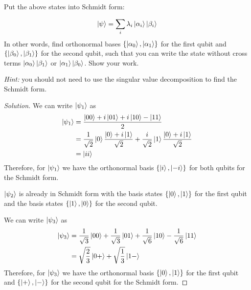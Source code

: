\begin{solution}[label=ques:4a]
  \begin{question}
    Put the above states into Schmidt form:

\[
\ket{\psi} = \sum_{i} \lambda_{i} \ket{\alpha_i}\ket{\beta_i}
\]
In other words, find orthonormal bases $\{\ket{\alpha_0},\ket{\alpha_1}\}$ for the first qubit and $\{\ket{\beta_0},\ket{\beta_1}\}$ for the second qubit, such that you can write the state without cross terms $\ket{\alpha_0}\ket{\beta_1}$ or $\ket{\alpha_1}\ket{\beta_0}$.
Show your work.

\noindent \textit{Hint:} you should not need to use the singular value decomposition to find the Schmidt form.
  \end{question}
  \tcblower{}
  \begin{proof}[Solution]
    We can write $\ket{\psi_1}$ as
    \begin{equation}
      \begin{split}
        \ket{\psi_1} &= \frac{\ket{00} + i\ket{01} +  i\ket{10} - \ket{11}}{2}\\
        &= \frac{1}{\sqrt{2}}\ket{0}\frac{\ket{0} + i\ket{1}}{\sqrt{2}} + \frac{i}{\sqrt{2}}\ket{1}\frac{\ket{0} + i\ket{1}}{\sqrt{2}}\\
        &= \ket{ii}
      \end{split}
      \label{eq:psi1sf}
    \end{equation}
    Therefore, for $\ket{\psi_1}$ we have the orthonormal basis $\{\ket{i}, \ket{-i}\}$ for both qubits for the Schmidt form.\par\bigskip

    $\ket{\psi_2}$ is already in Schmidt form with the basis states $\{\ket{0}, \ket{1}\}$ for the first qubit and the basis states $\{\ket{1}, \ket{0}\}$ for the second qubit.\par\bigskip

    We can write $\ket{\psi_3}$ as
    \begin{equation}
      \begin{split}
        \ket{\psi_3} &= \frac{1}{\sqrt{3}}\ket{00} + \frac{1}{\sqrt{3}}\ket{01} + \frac{1}{\sqrt{6}}\ket{10} - \frac{1}{\sqrt{6}}\ket{11}\\
        &= \sqrt{\frac{2}{3}}\ket{0+} + \sqrt{\frac{1}{3}}\ket{1-}
      \end{split}
      \label{eq:psi3sf}
    \end{equation}
    Therefore, for $\ket{\psi_3}$ we have the orthonormal basis $\{\ket{0}, \ket{1}\}$ for the first qubit and $\{\ket{+}, \ket{-}\}$ for the second qubit for the Schmidt form.
  \end{proof}
\end{solution}

